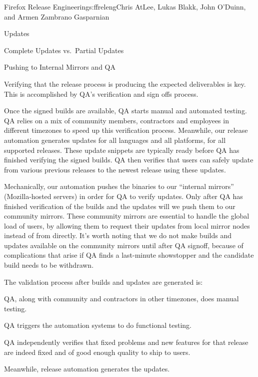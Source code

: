 \begin{aosachapter}{Firefox Release Engineering}{s:ffreleng}{Chris AtLee, Lukas Blakk, John O'Duinn, and Armen Zambrano Gasparnian}
\begin{aosasect1}{Updates}
\begin{aosasect2}{Complete Updates vs.\ Partial Updates}
\end{aosasect2}

\end{aosasect1}

\begin{aosasect1}{Pushing to Internal Mirrors and QA}

Verifying that the release process is producing the expected
deliverables is key. This
is accomplished by QA's verification and sign offs process.

Once the signed builds are available, QA starts manual and automated
testing. QA relies on a mix of community members,
contractors and employees in different timezones to speed up this
verification process. Meanwhile, our release automation generates
updates for all languages and all platforms, for all supported
releases.  These update snippets are typically ready before QA 
has finished verifying the signed builds. QA then verifies that users 
can safely update from various previous releases to the newest 
release using these updates. 

Mechanically, our automation pushes the binaries to our ``internal
mirrors'' (Mozilla-hosted servers) in order for QA to verify
updates. Only after QA has finished verification of the builds and
the updates will we push them to our
community mirrors. These community mirrors are essential to
handle the global load of users, by allowing them to request their updates
from local mirror nodes instead of from 
directly. It's worth noting that we do not make builds and updates
available on the community mirrors until after QA signoff, because of
complications that arise if QA finds a last-minute showstopper
and the candidate build needs to be withdrawn.

The validation process after builds and updates are generated is:

\begin{aosaitemize}

\item QA, along with community and contractors in other timezones, does
  manual testing.

\item QA triggers the automation systems to do functional testing.

\item QA independently verifies that fixed problems and new
  features for that release are indeed fixed and of good enough
  quality to ship to users.

\item Meanwhile, release automation generates the updates.


\end{aosaitemize}
\end{aosasect1}
\end{aosachapter}
